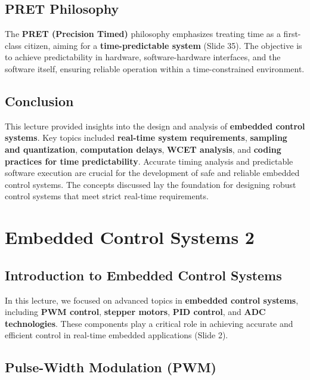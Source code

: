 \documentclass[
  14pt,
  a4paper,
  numbers=noendperiod,
  headinclude=true,
  footinclude=true,
  DIV=calc]{scrreprt}
\begin{document}
\section{PRET Philosophy}\label{pret-philosophy}

The \textbf{PRET (Precision Timed)} philosophy emphasizes treating time
as a first-class citizen, aiming for a \textbf{time-predictable system}
(Slide 35). The objective is to achieve predictability in hardware,
software-hardware interfaces, and the software itself, ensuring reliable
operation within a time-constrained environment.

\section{Conclusion}\label{conclusion-5}

This lecture provided insights into the design and analysis of
\textbf{embedded control systems}. Key topics included \textbf{real-time
system requirements}, \textbf{sampling and quantization},
\textbf{computation delays}, \textbf{WCET analysis}, and \textbf{coding
practices for time predictability}. Accurate timing analysis and
predictable software execution are crucial for the development of safe
and reliable embedded control systems. The concepts discussed lay the
foundation for designing robust control systems that meet strict
real-time requirements.

\chapter{Embedded Control Systems 2}\label{embedded-control-systems-2}

\section{Introduction to Embedded Control
Systems}\label{introduction-to-embedded-control-systems-1}

In this lecture, we focused on advanced topics in \textbf{embedded
control systems}, including \textbf{PWM control}, \textbf{stepper
motors}, \textbf{PID control}, and \textbf{ADC technologies}. These
components play a critical role in achieving accurate and efficient
control in real-time embedded applications (Slide 2).

\section{Pulse-Width Modulation (PWM)}\label{pulse-width-modulation-pwm}
\end{document}
